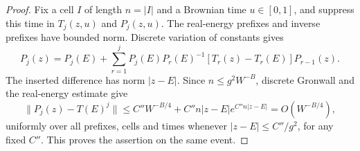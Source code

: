 \documentclass[11pt]{article}
\numberwithin{equation}{section}
\theoremstyle{remark}
\begin{document}
\begin{proof}
Fix a cell $I$ of length $n=|I|$ and a Brownian time $u\in[0,1]$,
and suppress this time in
$T_j(z,u)$ and $P_j(z,u)$.
The real-energy prefixes and inverse prefixes have bounded norm.
Discrete variation of constants gives
\begin{equation}\label{uvc:eq:transfer-duhamel}
 P_j(z)=P_j(E)+\sum_{r=1}^j
 P_j(E)P_r(E)^{-1}[T_r(z)-T_r(E)]P_{r-1}(z).
\end{equation}
The inserted difference has norm $|z-E|$. Since $n\le g^2W^{-B}$,
discrete Gronwall and the real-energy estimate give
\[
 \|P_j(z)-T(E)^j\|
 \le C''W^{-B/4}+C''n|z-E|e^{C''n|z-E|}
 =O(W^{-B/4}),
\]
uniformly over all prefixes, cells and times whenever
$|z-E|\le C''/g^2$, for any fixed $C''$. This proves the assertion
on the same event.
\end{proof}
\end{document}
